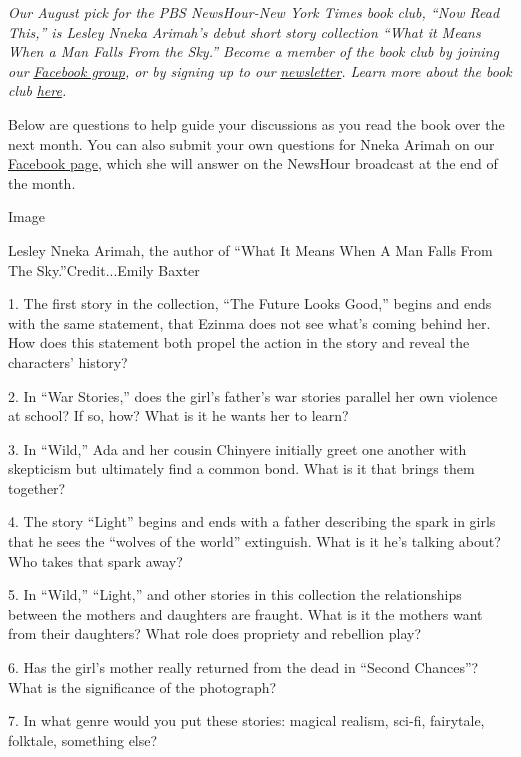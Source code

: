 \emph{Our August pick for the PBS NewsHour-New York Times book club,
``Now Read This,'' is Lesley Nneka Arimah's debut short story collection
``What it Means When a Man Falls From the Sky.'' Become a member of the
book club by joining our}
\href{https://www.facebookcorewwwi.onion/groups/NowReadThisBookClub}{\emph{Facebook
group}}\emph{, or by signing up to our}
\href{https://pbs.us1.list-manage.com/subscribe?u=8aa1c620fd96b27384151c36e\&id=2fe6581b35}{\emph{newsletter}}\emph{.
Learn more about the book club}
\href{https://www.pbs.org/newshour/arts/what-is-now-read-this}{\emph{here}}\emph{.}

Below are questions to help guide your discussions as you read the book
over the next month. You can also submit your own questions for Nneka
Arimah on our
\href{https://www.facebookcorewwwi.onion/groups/NowReadThisBookClub}{Facebook
page}, which she will answer on the NewsHour broadcast at the end of the
month.

Image

Lesley Nneka Arimah, the author of ``What It Means When A Man Falls From
The Sky.''Credit...Emily Baxter

1. The first story in the collection, ``The Future Looks Good,'' begins
and ends with the same statement, that Ezinma does not see what's coming
behind her. How does this statement both propel the action in the story
and reveal the characters' history?

2. In ``War Stories,'' does the girl's father's war stories parallel her
own violence at school? If so, how? What is it he wants her to learn?

3. In ``Wild,'' Ada and her cousin Chinyere initially greet one another
with skepticism but ultimately find a common bond. What is it that
brings them together?

4. The story ``Light'' begins and ends with a father describing the
spark in girls that he sees the ``wolves of the world'' extinguish. What
is it he's talking about? Who takes that spark away?

5. In ``Wild,'' ``Light,'' and other stories in this collection the
relationships between the mothers and daughters are fraught. What is it
the mothers want from their daughters? What role does propriety and
rebellion play?

6. Has the girl's mother really returned from the dead in ``Second
Chances''? What is the significance of the photograph?

7. In what genre would you put these stories: magical realism, sci-fi,
fairytale, folktale, something else?

